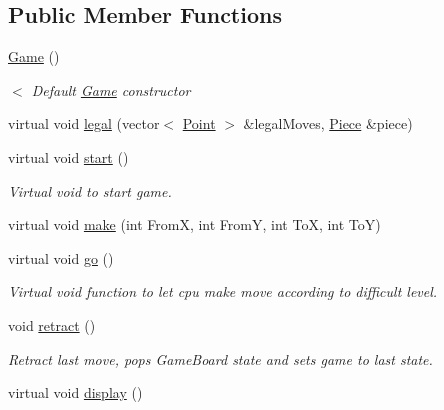 \subsection*{Public Member Functions}
\begin{DoxyCompactItemize}
\item 
\hyperlink{class_game_ad59df6562a58a614fda24622d3715b65}{Game} ()
\begin{DoxyCompactList}\small\item\em $<$ Default \hyperlink{class_game}{Game} constructor \end{DoxyCompactList}\item 
virtual void \hyperlink{class_game_acf61b27aed22684d96fbc7fa2692feeb}{legal} (vector$<$ \hyperlink{struct_point}{Point} $>$ \&legal\-Moves, \hyperlink{class_piece}{Piece} \&piece)
\item 
virtual void \hyperlink{class_game_a3d9b98f7c4a96ecf578f75b96c9f0e90}{start} ()
\begin{DoxyCompactList}\small\item\em Virtual void to start game. \end{DoxyCompactList}\item 
virtual void \hyperlink{class_game_a50b3e0e1e7a73793a9f9eae1b0660eff}{make} (int From\-X, int From\-Y, int To\-X, int To\-Y)
\item 
\hypertarget{class_game_ab411d0da584724addd4fdb96fc16b9a4}{virtual void \hyperlink{class_game_ab411d0da584724addd4fdb96fc16b9a4}{go} ()}\label{class_game_ab411d0da584724addd4fdb96fc16b9a4}

\begin{DoxyCompactList}\small\item\em Virtual void function to let cpu make move according to difficult level. \end{DoxyCompactList}\item 
\hypertarget{class_game_a9be0655102af94f1a37a7eaec1be36fc}{void \hyperlink{class_game_a9be0655102af94f1a37a7eaec1be36fc}{retract} ()}\label{class_game_a9be0655102af94f1a37a7eaec1be36fc}

\begin{DoxyCompactList}\small\item\em Retract last move, pops Game\-Board state and sets game to last state. \end{DoxyCompactList}\item 
\hypertarget{class_game_a4d0223a84926cbabea95ed7e0392690a}{virtual void \hyperlink{class_game_a4d0223a84926cbabea95ed7e0392690a}{display} ()}\label{class_game_a4d0223a84926cbabea95ed7e0392690a}


\end{DoxyCompactItemize}
